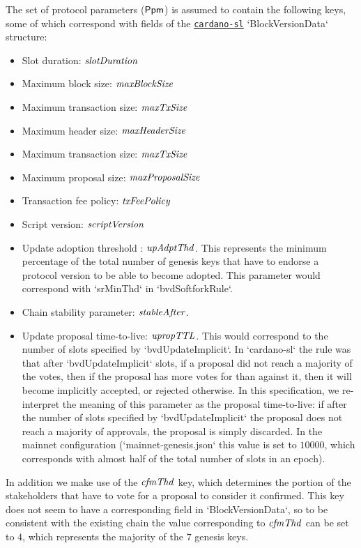 The set of protocol parameters ($\mathsf{Ppm}$) is assumed to contain the following
keys, some of which correspond with fields of the
\href{https://github.com/input-output-hk/cardano-sl/}{\texttt{cardano-sl}}
`BlockVersionData` structure:
\begin{itemize}
\item Slot duration: $\mathit{slotDuration}$
\item Maximum block size: $\mathit{maxBlockSize}$
\item Maximum transaction size: $\mathit{maxTxSize}$
\item Maximum header size: $\mathit{maxHeaderSize}$
\item Maximum transaction size: $\mathit{maxTxSize}$
\item Maximum proposal size: $\mathit{maxProposalSize}$
\item Transaction fee policy: $\mathit{txFeePolicy}$
\item Script version: $\mathit{scriptVersion}$
\item Update adoption threshold : $\mathit{upAdptThd}$. This represents the
  minimum percentage of the total number of genesis keys that have to endorse a
  protocol version to be able to become adopted. This parameter would
  correspond with `srMinThd` in `bvdSoftforkRule`.
\item Chain stability parameter: $\mathit{stableAfter}$.
\item Update proposal time-to-live: $\mathit{upropTTL}$. This would correspond to
  the number of slots specified by `bvdUpdateImplicit`. In `cardano-sl` the
  rule was that after `bvdUpdateImplicit` slots, if a proposal did not reach a
  majority of the votes, then if the proposal has more votes for than against
  it, then it will become implicitly accepted, or rejected otherwise. In this
  specification, we re-interpret the meaning of this parameter as the proposal
  time-to-live: if after the number of slots specified by `bvdUpdateImplicit`
  the proposal does not reach a majority of approvals, the proposal is simply
  discarded. In the mainnet configuration (`mainnet-genesis.json` this value is
  set to $10000$, which corresponds with almost half of the total number of
  slots in an epoch).
\end{itemize}
In addition we make use of the $\mathit{cfmThd}$ key, which determines the portion
of the stakeholders that have to vote for a proposal to consider it confirmed.
This key does not seem to have a corresponding field in `BlockVersionData`, so
to be consistent with the existing chain the value corresponding to
$\mathit{cfmThd}$ can be set to $4$, which represents the majority of the $7$
genesis keys.

